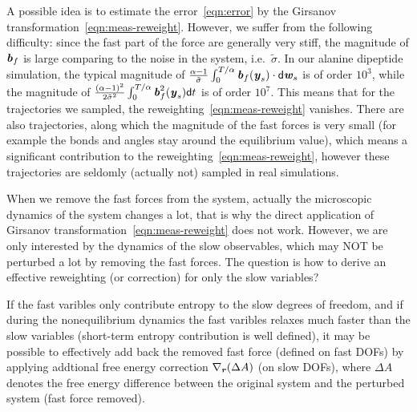\documentclass[aip,jcp,a4paper,reprint,onecolumn]{revtex4-1}
\newcommand{\recheck}[1]{{\color{red} #1}}
\newcommand{\vect}[1]{\textbf{\textit{#1}}}
\newcommand{\dd}{\textsf{d}}
\newcommand{\pathmeas}{\mathcal P}
\begin{document}
\recheck{ A possible idea is to estimate the error~\eqref{eqn:error}
  by the Girsanov transformation~\eqref{eqn:meas-reweight}. However, we
  suffer from the following difficulty: since the fast part of the
  force are generally very stiff, the magnitude of $\vect b_f$ is
  large comparing to the noise in the system,
  i.e.~$\tilde\sigma$. In our alanine dipeptide simulation,
  the typical magnitude of
  $\frac{\alpha-1}{\tilde{\sigma}}\int_0^{T/\alpha}\vect b_f(\vect
  y_s)\cdot\dd\vect w_s$ is of order $10^3$, while the magnitude of
  $\frac{(\alpha-1)^2}{2\tilde\sigma^2} \int_0^{T/\alpha}\vect
  b_f^2(\vect y_s)\dd t$ is of order $10^7$.  This means that for the
  trajectories we sampled, the reweighting~\eqref{eqn:meas-reweight}
  vanishes. There are also trajectories, along which the magnitude of
  the fast forces is very small (for example the bonds and angles stay
  around the equilibrium value), which means a significant contribution
  to the reweighting~\eqref{eqn:meas-reweight}, however  these
  trajectories are seldomly (actually not) sampled in real
  simulations.

  When we remove the fast forces from the system, actually the
  microscopic dynamics of the system changes a lot, that is why the
  direct application of Girsanov
  transformation~\eqref{eqn:meas-reweight} does not work.  However, we
  are only interested by the dynamics of the slow observables, which may NOT
  be perturbed a lot by removing the fast forces.  The question is how
  to derive an effective reweighting (or correction) for only the slow variables?

  If the fast varibles only contribute entropy to the slow degrees of
  freedom, and if during the nonequilibrium dynamics the fast varibles
  relaxes much faster than the slow variables (short-term entropy
  contribution is well defined), it may be possible to effectively
  add back the removed fast force (defined on fast DOFs)  by
  applying addtional free energy correction $\nabla_{\vect r}( \Delta A)$
  (on slow DOFs), 
  where $\Delta A$ denotes the free energy difference between
  the original system and the perturbed system (fast force removed).
}
\end{document}
